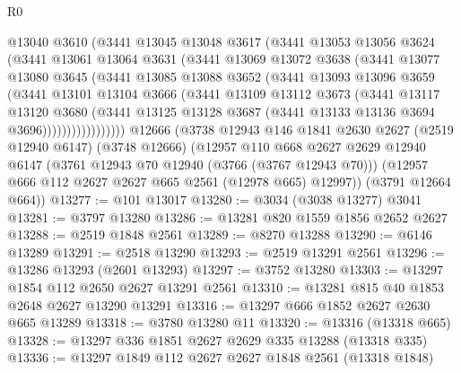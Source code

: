 \begin{lexlean}{R0}
\begin{coremodule}
              @13040
              @3610
              (@3441
                @13045
                @13048
                @3617
                (@3441
                  @13053
                  @13056
                  @3624
                  (@3441
                    @13061
                    @13064
                    @3631
                    (@3441
                      @13069
                      @13072
                      @3638
                      (@3441
                        @13077
                        @13080
                        @3645
                        (@3441
                          @13085
                          @13088
                          @3652
                          (@3441
                            @13093
                            @13096
                            @3659
                            (@3441
                              @13101
                              @13104
                              @3666
                              (@3441
                                @13109
                                @13112
                                @3673
                                (@3441
                                  @13117
                                  @13120
                                  @3680
                                  (@3441
                                    @13125
                                    @13128
                                    @3687
                                    (@3441 @13133 @13136 @3694 @3696)))))))))))))))))
    @12666
    (@3738
      @12943
      @146
      @1841
      @2630
      @2627
      (@2519 @12940 @6147)
      (@3748 @12666)
      (@12957
        @110
        @668
        @2627
        @2629
        @12940
        @6147
        (@3761 @12943 @70 @12940 (@3766 (@3767 @12943 @70)))
        (@12957 @666 @112 @2627 @2627 @665 @2561 (@12978 @665) @12997))
      (@3791 @12664 @664))
@13277 := @101 @13017
@13280 := @3034 (@3038 @13277) @3041
@13281 := @3797 @13280
@13286 := @13281 @820 @1559 @1856 @2652 @2627
@13288 := @2519 @1848 @2561
@13289 := @8270 @13288
@13290 := @6146 @13289
@13291 := @2518 @13290
@13293 := @2519 @13291 @2561
@13296 := @13286 @13293 (@2601 @13293)
@13297 := @3752 @13280
@13303 := @13297 @1854 @112 @2650 @2627 @13291 @2561
@13310 := @13281 @815 @40 @1853 @2648 @2627 @13290 @13291
@13316 := @13297 @666 @1852 @2627 @2630 @665 @13289
@13318 := @3780 @13280 @11
@13320 := @13316 (@13318 @665)
@13328 := @13297 @336 @1851 @2627 @2629 @335 @13288 (@13318 @335)
@13336 := @13297 @1849 @112 @2627 @2627 @1848 @2561 (@13318 @1848)

\end{coremodule}
\end{lexlean}
